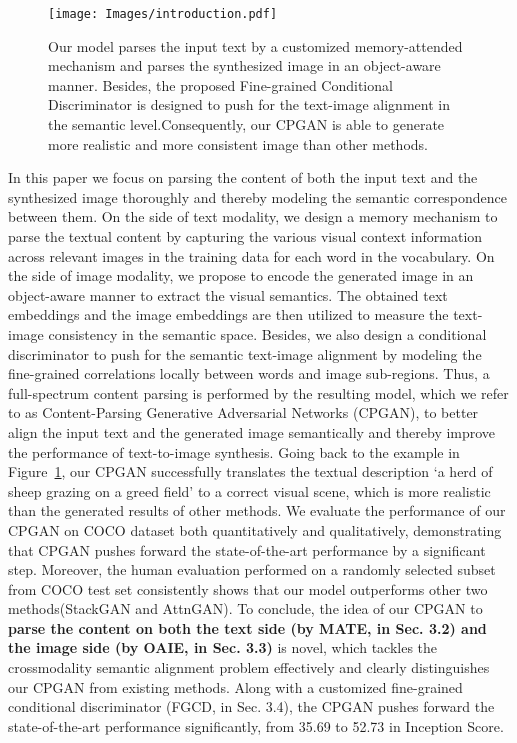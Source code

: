 \documentclass[runningheads]{llncs}
\begin{document}
\begin{figure}[t]
\centering
\texttt{[image: Images/introduction.pdf]}
\caption{Our model parses the input text by a customized memory-attended mechanism and parses the synthesized image in an object-aware manner. Besides, the proposed Fine-grained Conditional Discriminator is designed to push for the text-image alignment in the semantic level.Consequently, our CPGAN is able to generate more realistic and more consistent image than other methods.}
\label{fig:intro}
\end{figure}

\noindent In this paper we focus on parsing the content of both the input text and the synthesized image thoroughly and thereby modeling the semantic correspondence between them. On the side of text modality, we design a memory mechanism to parse the textual content by capturing the various visual context information across relevant images in the training data for each word in the vocabulary. On the side of image modality, we propose to encode the generated image in an object-aware manner to extract the visual semantics. The obtained text embeddings and the image embeddings are then utilized to measure the text-image consistency in the semantic space. Besides, we also design a conditional discriminator to push for the semantic text-image alignment by modeling the fine-grained correlations locally between words and image sub-regions. Thus, a full-spectrum content parsing is performed by the resulting model, which we refer to as Content-Parsing Generative Adversarial Networks (CPGAN), to better align the input text and the generated image semantically and thereby improve the performance of text-to-image synthesis. Going back to the example in Figure~\ref{fig:intro}, our CPGAN successfully translates the textual description `a herd of sheep grazing on a greed field' to a correct visual scene, which is more realistic than the generated results of other methods.
We evaluate the performance of our CPGAN on COCO dataset both quantitatively and qualitatively, demonstrating that CPGAN pushes forward the state-of-the-art performance by a significant step. Moreover, the human evaluation performed on a randomly selected subset from COCO test set consistently shows that our model outperforms other two methods(StackGAN and AttnGAN).
To conclude, the idea of our CPGAN to \textbf{parse the content on both the text side (by MATE, in Sec. 3.2) and the image side (by OAIE, in Sec. 3.3)} is novel, which tackles the cross\text{-}modality semantic alignment problem effectively and clearly distinguishes our CPGAN from existing methods. Along with a customized fine-grained conditional discriminator (FGCD, in Sec. 3.4), the CPGAN pushes forward the state-of-the-art performance significantly, from 35.69 to 52.73 in Inception Score.
\end{document}
